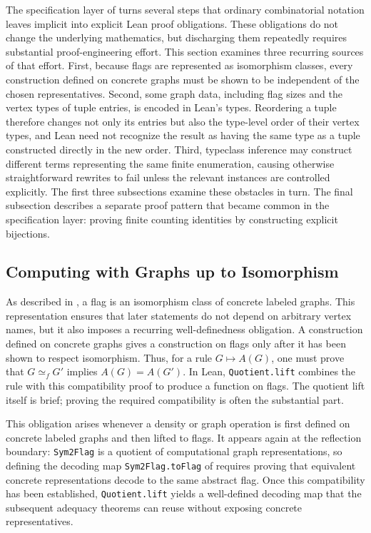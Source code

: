 \documentclass[acmsmall,screen=true,acmthm=false]{acmart}
\DeclareRobustCommand{\lean}[1]{{\def\_{\textunderscore\allowbreak}\texttt{#1}}}
\begin{document}
The specification layer of  turns several steps that
ordinary combinatorial notation leaves implicit into explicit Lean proof
obligations.  These obligations do not change the underlying mathematics, but
discharging them repeatedly requires substantial proof-engineering effort.
This section examines three recurring sources of that effort.  First, because
flags are represented as isomorphism classes, every construction defined on
concrete graphs must be shown to be independent of the chosen representatives.
Second, some graph data, including flag sizes and the vertex types of tuple
entries, is encoded in Lean's types.  Reordering a tuple therefore changes not
only its entries but also the type-level order of their vertex types, and Lean
need not recognize the result as having the same type as a tuple constructed
directly in the new order.  Third, typeclass inference may construct different
terms representing the same finite enumeration, causing otherwise
straightforward rewrites to fail unless the relevant instances are controlled
explicitly.  The first three subsections examine these obstacles in turn.  The
final subsection describes a separate proof pattern that became common in the
specification layer: proving finite counting identities by constructing
explicit bijections.

\subsection{Computing with Graphs up to Isomorphism}

As described in , a flag is an isomorphism class of
concrete labeled graphs.  This representation ensures that later statements
do not depend on arbitrary vertex names, but it also imposes a recurring
well-definedness obligation.  A construction defined on concrete graphs gives
a construction on flags only after it has been shown to respect isomorphism.
Thus, for a rule $G\mapsto A(G)$, one must prove
that $G \simeq_f G'$ implies $A(G)=A(G')$.
In Lean, \lean{Quotient.lift} combines the rule with this compatibility proof
to produce a function on flags.  The quotient lift itself is brief; proving
the required compatibility is often the substantial part.

This obligation arises whenever a density or graph operation is first defined
on concrete labeled graphs and then lifted to flags.  It appears again at the
reflection boundary: \lean{Sym2Flag} is a quotient of computational graph
representations, so defining the decoding map
\lean{Sym2Flag.toFlag} of  requires proving that
equivalent concrete representations decode to the same abstract flag.  Once
this compatibility has been established, \lean{Quotient.lift} yields a
well-defined decoding map that the subsequent adequacy theorems can reuse
without exposing concrete representatives.
\end{document}
